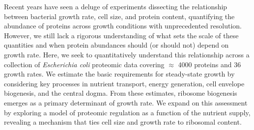 Recent years have seen a deluge of experiments dissecting the relationship
between bacterial growth rate, cell size, and protein content, quantifying the
abundance of proteins across growth conditions with unprecedented resolution.
However, we still lack a rigorous understanding of what sets the scale of these
quantities and when protein abundances should (or should not) depend on growth
rate. Here, we seek to quantitatively understand this relationship across a
collection of \textit{Escherichia coli} proteomic data covering $\approx$ 4000
proteins and 36 growth rates. We estimate the basic requirements for
steady-state growth by considering key processes in nutrient transport, energy
generation, cell envelope biogenesis, and the central dogma. From these
estimates, ribosome biogenesis emerges as a primary determinant of growth rate.
We expand on this assessment by exploring a model of proteomic regulation as a
function of the nutrient supply, revealing a mechanism that ties cell size and
growth rate to ribosomal content.
